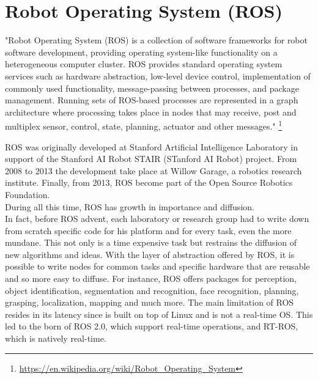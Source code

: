 \documentclass[pdftex,12pt,a4paper]{report}
\begin{document}
\newpage
\section{Robot Operating System (ROS)}
"Robot Operating System (ROS) is a collection of software frameworks for robot software development, providing operating system-like functionality on a heterogeneous computer cluster. ROS provides standard operating system services such as hardware abstraction, low-level device control, implementation of commonly used functionality, message-passing between processes, and package management. Running sets of ROS-based processes are represented in a graph architecture where processing takes place in nodes that may receive, post and multiplex sensor, control, state, planning, actuator and other messages." \footnote{\url{https://en.wikipedia.org/wiki/Robot_Operating_System}}
\newline

\noindent ROS was originally developed at Stanford Artificial Intelligence Laboratory in support of the Stanford AI Robot STAIR (STanford AI Robot) project. From 2008 to 2013 the development take place at Willow Garage, a robotics research institute. Finally, from 2013, ROS become part of the Open Source Robotics Foundation.\\
During all this time, ROS has growth in importance and diffusion. \\
In fact, before ROS advent, each laboratory or research group had to write down from scratch specific code for his platform and for every task, even the more mundane. This not only is a time expensive task but restrains the diffusion of new algorithms and ideas.
With the layer of abstraction offered by ROS, it is possible to write nodes for common tasks and specific hardware that are reusable and so more easy to diffuse. For instance, ROS offers packages for perception, object identification, segmentation and recognition, face recognition, planning, grasping, localization, mapping and much more. The main limitation of ROS resides in its latency since is built on top of Linux and is not a real-time OS. This led to the born of ROS 2.0, which support real-time operations, and RT-ROS, which is natively real-time. %

\newpage
\end{document}
